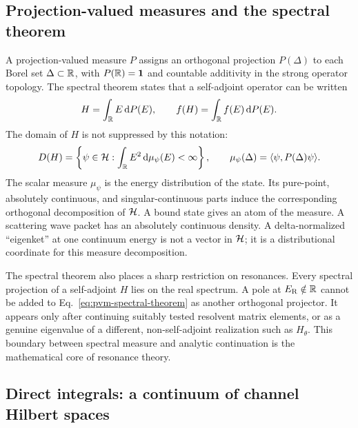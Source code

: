 \subsection{Projection-valued measures and the spectral theorem}
\label{subsec:pvm-spectral-theorem}

A projection-valued measure $P$ assigns an orthogonal projection $P(\Delta)$
to each Borel set $\Delta\subset\mathbb{R}$, with
$P(\mathbb{R})=\mathbf{1}$ and countable additivity in the strong operator
topology.  The spectral theorem states that a self-adjoint operator can be
written
\begin{equation}
  H=\int_{\mathbb{R}}E\,\mathrm{d} P(E),
  \qquad
  f(H)=\int_{\mathbb{R}}f(E)\,\mathrm{d} P(E) .
  \label{eq:pvm-spectral-theorem}
\end{equation}
The domain of $H$ is not suppressed by this notation:
\begin{equation}
  D(H)=\left\{\psi\in\mathcal{H}:
  \int_{\mathbb{R}}E^2\,\mathrm{d}\mu_\psi(E)<\infty\right\},
  \qquad
  \mu_\psi(\Delta)
  =\langle \psi,P(\Delta)\psi\rangle .
  \label{eq:spectral-measure-vector}
\end{equation}
The scalar measure $\mu_\psi$ is the energy distribution of the state.
Its pure-point, absolutely continuous, and singular-continuous parts induce
the corresponding orthogonal decomposition of $\mathcal{H}$.  A bound state gives
an atom of the measure.  A scattering wave packet has an absolutely
continuous density.  A delta-normalized ``eigenket'' at one continuum energy
is not a vector in $\mathcal{H}$; it is a distributional coordinate for this
measure decomposition.

The spectral theorem also places a sharp restriction on resonances.  Every
spectral projection of a self-adjoint $H$ lies on the real spectrum.  A pole at
$E_{\mathrm{R}}\notin\mathbb{R}$ cannot be added to
Eq.~\eqref{eq:pvm-spectral-theorem} as another orthogonal projector.  It
appears only after continuing suitably tested resolvent matrix elements, or as
a genuine eigenvalue of a different, non-self-adjoint realization such as
$H_\theta$.  This boundary between spectral measure and analytic
continuation is the mathematical core of resonance theory.

\subsection{Direct integrals: a continuum of channel Hilbert spaces}
\label{subsec:direct-integrals}

